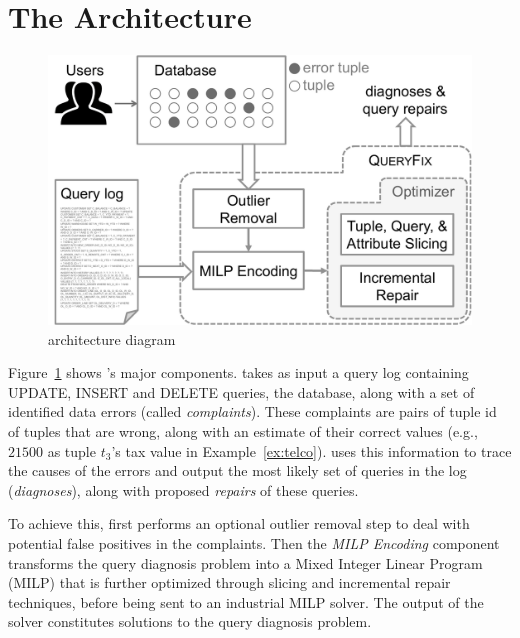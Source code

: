 \section{The {\large\textbf{\sys}} Architecture}

\begin{figure}[h]
    \centering
        \includegraphics[scale=0.25]{figures/architecture}
    \caption{\sys architecture diagram}
    \label{fig:architecture}
    \vspace*{-0.1in}
\end{figure}


Figure~\ref{fig:architecture} shows \sys's major components.  \sys takes as input 
a query log containing UPDATE, INSERT and DELETE queries, the database, along with a
set of identified data errors (called {\it complaints}).  These complaints are pairs
of tuple id of tuples that are wrong, along with an estimate of their correct values 
(e.g., $21500$ as tuple $t_3$'s tax value in Example~\ref{ex:telco}).
\sys uses this information to trace the causes of the errors and output the most likely set of 
queries in the log ({\it diagnoses}), along with proposed {\it repairs} of these queries.

To achieve this, \sys first performs an optional outlier removal step to deal with potential
false positives in the complaints.  Then the {\it MILP Encoding} component transforms the
query diagnosis problem into a Mixed Integer Linear Program (MILP) that is further optimized
through slicing and incremental repair techniques, before being sent
to an industrial MILP solver.  The output of the solver constitutes solutions to the query diagnosis
problem.

